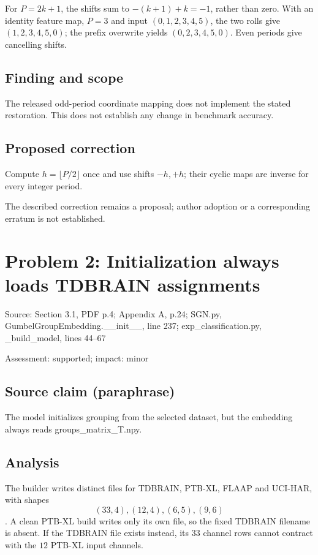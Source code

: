\documentclass[11pt]{article}
\begin{document}
For \(P=2k+1\), the shifts sum to \(-(k+1)+k=-1\), rather than zero. With an identity feature map, \(P=3\) and input \((0,1,2,3,4,5)\), the two rolls give \((1,2,3,4,5,0)\); the prefix overwrite yields \((0,2,3,4,5,0)\). Even periods give cancelling shifts.

\subsection*{Finding and scope}

The released odd-period coordinate mapping does not implement the stated restoration. This does not establish any change in benchmark accuracy.

\subsection*{Proposed correction}

Compute \(h=\lfloor P/2\rfloor\) once and use shifts \(-h,+h\); their cyclic maps are inverse for every integer period.

The described correction remains a proposal; author adoption or a corresponding erratum is not established.

\section*{Problem 2: Initialization always loads TDBRAIN assignments}

Source: Section 3.1, PDF p.4; Appendix A, p.24; SGN.py, GumbelGroupEmbedding.\_\_init\_\_, line 237; exp\_classification.py, \_build\_model, lines 44–67

Assessment: supported; impact: minor

\subsection*{Source claim (paraphrase)}

The model initializes grouping from the selected dataset, but the embedding always reads groups\_matrix\_T.npy.

\subsection*{Analysis}

The builder writes distinct files for TDBRAIN, PTB-XL, FLAAP and UCI-HAR, with shapes \[(33,4),(12,4),(6,5),(9,6)\]. A clean PTB-XL build writes only its own file, so the fixed TDBRAIN filename is absent. If the TDBRAIN file exists instead, its \(33\) channel rows cannot contract with the \(12\) PTB-XL input channels.
\end{document}
